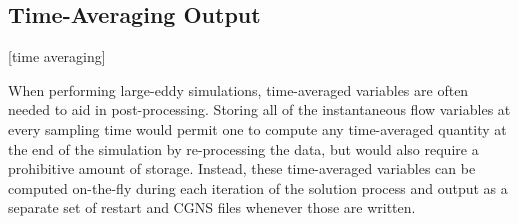 \subsection{Time-Averaging Output}%
\label{SEC:Files:Time_Averaging_Output}
\key*{}[time averaging]


When performing large-eddy simulations, time-averaged variables are
often needed to aid in post-processing.
%
Storing all of the instantaneous flow variables at every sampling time
would permit one to compute any time-averaged quantity at the end of the
simulation by re-processing the data, but would also require a prohibitive
amount of storage.
%
Instead, these time-averaged variables can be computed on-the-fly
during each iteration of the solution process and output as a
separate set of restart and CGNS files whenever those are written.


